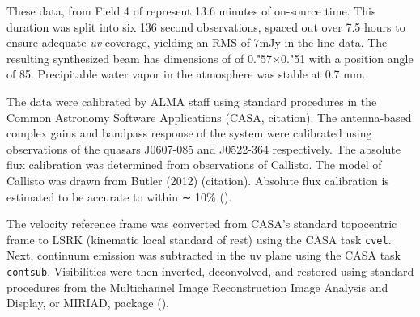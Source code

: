 These data, from Field 4 of \citet{mann_alma_2014} represent 13.6 minutes of on-source time. This duration was split into six 136 second observations, spaced out over 7.5 hours to ensure adequate \textit{uv} coverage, yielding an RMS of 7mJy in the line data. The resulting synthesized beam has dimensions of of 0."57$\times$0."51 with a position angle of 85\degree. Precipitable water vapor in the atmosphere was stable at 0.7 mm.


The data were calibrated by ALMA staff using standard procedures in the Common Astronomy Software Applications (CASA, citation). The antenna-based complex gains and bandpass response of the system were calibrated using observations of the quasars J0607-085 and J0522-364 respectively. The absolute flux calibration was determined from observations of Callisto. The model of Callisto was drawn from Butler (2012) (citation). Absolute flux calibration is estimated to be accurate to within ∼ 10\% (\citet{mann_alma_2014}).

The velocity reference frame was converted from CASA's standard topocentric frame to LSRK (kinematic local standard of rest) using the CASA task \texttt{cvel}. Next, continuum emission was subtracted in the uv plane using the CASA task \texttt{contsub}. Visibilities were then inverted, deconvolved, and restored using standard procedures from the Multichannel Image Reconstruction Image Analysis and Display, or MIRIAD, package (\citet{rj_sault_astronomical_1995}).





